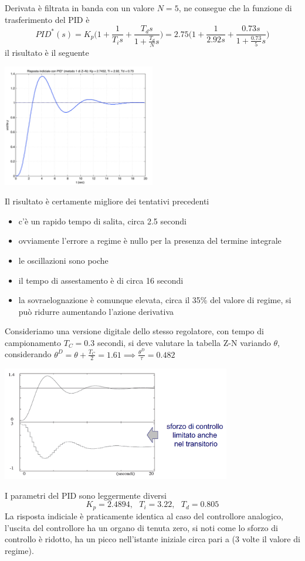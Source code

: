 \documentclass[10pt, letterpaper]{report}
\begin{document}
Derivata è filtrata in banda con un valore $N=5$, ne consegue che la funzione di trasferimento del PID è 
$$ PID^*(s)=
K_p\Big(1+\frac{1}{T_i s}+\dfrac{T_d s}{1+\frac{T_d}{N}s}\Big)= 
2.75\Big(1+\frac{1}{2.92 s}+\dfrac{0.73  s}{1+\frac{0.73 }{5}s}\Big)
$$
il risultato è il seguente
\begin{center}
    \includegraphics[width=0.5\textwidth]{images/ZN6.png}
\end{center}
Il risultato è certamente migliore dei tentativi precedenti \begin{itemize}
    \item c'è un rapido tempo di salita, circa 2.5 secondi 
    \item ovviamente l'errore a regime è nullo per la presenza del termine integrale 
    \item le oscillazioni sono poche 
    \item il tempo di assestamento è di circa 16 secondi 
    \item la sovraelognazione è comunque elevata, circa il 35\% del valore di regime, si può ridurre aumentando l'azione derivativa
\end{itemize}
Consideriamo una versione digitale dello stesso regolatore, con tempo di campionamento $T_C=0.3$ secondi, si deve valutare la tabella Z-N variando $\theta$, considerando $\theta^D=\theta + \frac{T_C}{2}=1.61\implies \frac{\theta^D}{\tau}=0.482$
\begin{center}
    \includegraphics[width=0.75\textwidth]{images/ZN7.png}
\end{center}
I parametri del PID sono leggermente diversi
$$ K_p=2.4894, \ \  \
T_i=3.22, \ \  \
T_d=0.805 $$
La risposta indiciale è praticamente identica al caso del controllore analogico, l'uscita del controllore ha un organo di tenuta zero, si noti come lo sforzo di controllo è ridotto, ha un picco nell'istante iniziale circa pari a  (3 volte il valore di regime).
\end{document}
